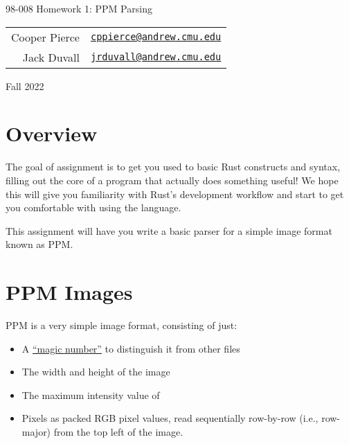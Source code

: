 \documentclass{article}
\newcommand{\longsemester}{Fall 2022}
\newcommand{\deptcode}{98}
\newcommand{\coursecode}{008}
\newcommand{\fullcoursecode}{\deptcode-\coursecode}
\begin{document}
\thispagestyle{empty}
\begin{center}
    \begin{minipage}{.85\textwidth}
        \centering
        {\huge {\fullcoursecode} Homework 1: PPM Parsing}

        \vspace{1em}

        \begin{tabular}{@{}rl@{}}
            Cooper Pierce & \href{mailto:cppierce@andrew.cmu.edu}{\texttt{cppierce@andrew.cmu.edu}} \\
            Jack Duvall & \href{mailto:jrduvall@andrew.cmu.edu}{\texttt{jrduvall@andrew.cmu.edu}} \\
        \end{tabular}

        \vspace{1em}

        \longsemester
    \end{minipage}
\end{center}

\section*{Overview}

The goal of assignment is to get you used to basic Rust constructs and syntax, filling out the core of a program that actually does something useful! We hope this will give you familiarity with Rust's development workflow and start to get you comfortable with using the language.

This assignment will have you write a basic parser for a simple image format known as PPM.

\section*{PPM Images}
PPM is a very simple image format, consisting of just:
\begin{itemize}
    \item A \href{https://en.wikipedia.org/wiki/List_of_file_signatures}{``magic number''} to distinguish it from other files
    \item The width and height of the image
    \item The maximum intensity value of
    \item Pixels as packed RGB pixel values, read sequentially row-by-row
          (i.e., row-major) from the top left of the image.
\end{itemize}
\end{document}
